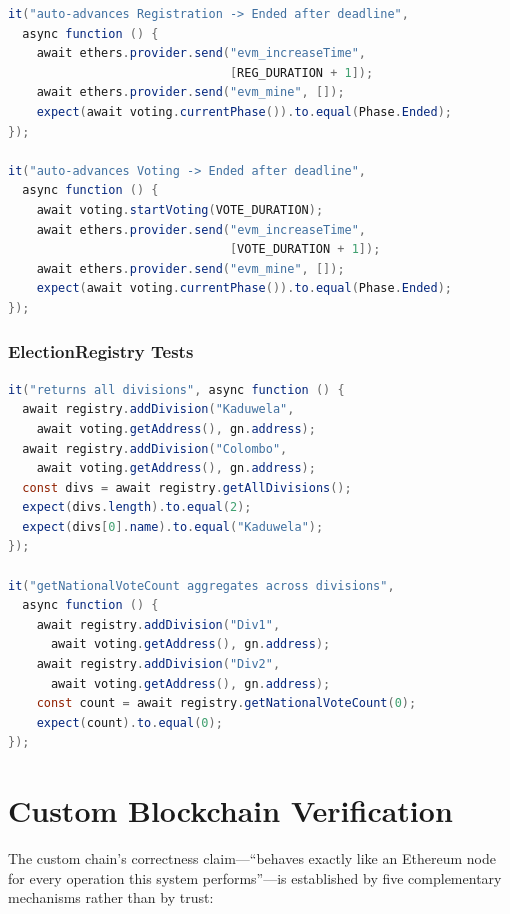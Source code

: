 \begin{lstlisting}[language=Java, caption={Test: automatic phase advancement on deadline expiry.}]
it("auto-advances Registration -> Ended after deadline",
  async function () {
    await ethers.provider.send("evm_increaseTime",
                               [REG_DURATION + 1]);
    await ethers.provider.send("evm_mine", []);
    expect(await voting.currentPhase()).to.equal(Phase.Ended);
});

it("auto-advances Voting -> Ended after deadline",
  async function () {
    await voting.startVoting(VOTE_DURATION);
    await ethers.provider.send("evm_increaseTime",
                               [VOTE_DURATION + 1]);
    await ethers.provider.send("evm_mine", []);
    expect(await voting.currentPhase()).to.equal(Phase.Ended);
});
\end{lstlisting}

\subsubsection{ElectionRegistry Tests}

\begin{lstlisting}[language=Java, caption={Tests: division management and national aggregation.}]
it("returns all divisions", async function () {
  await registry.addDivision("Kaduwela",
    await voting.getAddress(), gn.address);
  await registry.addDivision("Colombo",
    await voting.getAddress(), gn.address);
  const divs = await registry.getAllDivisions();
  expect(divs.length).to.equal(2);
  expect(divs[0].name).to.equal("Kaduwela");
});

it("getNationalVoteCount aggregates across divisions",
  async function () {
    await registry.addDivision("Div1",
      await voting.getAddress(), gn.address);
    await registry.addDivision("Div2",
      await voting.getAddress(), gn.address);
    const count = await registry.getNationalVoteCount(0);
    expect(count).to.equal(0);
});
\end{lstlisting}

\section{Custom Blockchain Verification}\label{sec:chain-verification}

The custom chain's correctness claim---``behaves exactly like an Ethereum node for every operation this system performs''---is established by five complementary mechanisms rather than by trust:

